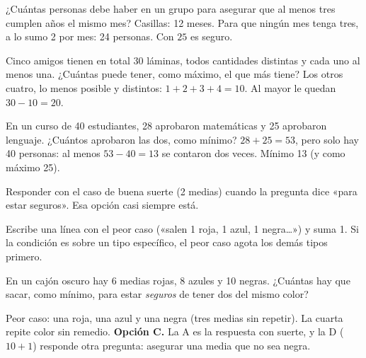 \begin{ejemplo}[Cumpleaños]
¿Cuántas personas debe haber en un grupo para asegurar que al menos tres cumplen años el mismo mes?
\solucion Casillas: 12 meses. Para que ningún mes tenga tres, a lo sumo 2 por mes: 24 personas. Con $25$ es seguro.
\end{ejemplo}

\begin{ejemplo}
Cinco amigos tienen en total 30 láminas, todos cantidades distintas y cada uno al menos una. ¿Cuántas puede tener, como
máximo, el que más tiene?
\solucion Los otros cuatro, lo menos posible y distintos: $1 + 2 + 3 + 4 = 10$. Al mayor le quedan $30 - 10 = 20$.
\end{ejemplo}

\begin{ejemplo}
En un curso de 40 estudiantes, 28 aprobaron matemáticas y 25 aprobaron lenguaje. ¿Cuántos aprobaron las dos, como mínimo?
\solucion $28 + 25 = 53$, pero solo hay 40 personas: al menos $53 - 40 = 13$ se contaron dos veces. Mínimo 13 (y como
máximo 25).
\end{ejemplo}

\begin{trampa}
Responder con el caso de buena suerte (2 medias) cuando la pregunta dice «para estar seguros». Esa opción casi siempre
está.
\end{trampa}

\begin{atajo}
Escribe una línea con el peor caso («salen 1 roja, 1 azul, 1 negra…») y suma 1. Si la condición es sobre un tipo
específico, el peor caso agota los demás tipos primero.
\end{atajo}

\begin{reto}
En un cajón oscuro hay 6 medias rojas, 8 azules y 10 negras. ¿Cuántas hay que sacar, como mínimo, para estar
\emph{seguros} de tener dos del mismo color?
\end{reto}

\begin{retoresuelto}
Peor caso: una roja, una azul y una negra (tres medias sin repetir). La cuarta repite color sin remedio.
\textbf{Opción C.} La A es la respuesta con suerte, y la D ($10 + 1$) responde otra pregunta: asegurar una media que no sea negra.
\end{retoresuelto}

